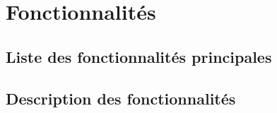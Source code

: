 \newpage
\section{Fonctionnalités}
\subsection{Liste des fonctionnalités principales}
\subsection{Description des fonctionnalités}
    \decrireFonctionPrincipal